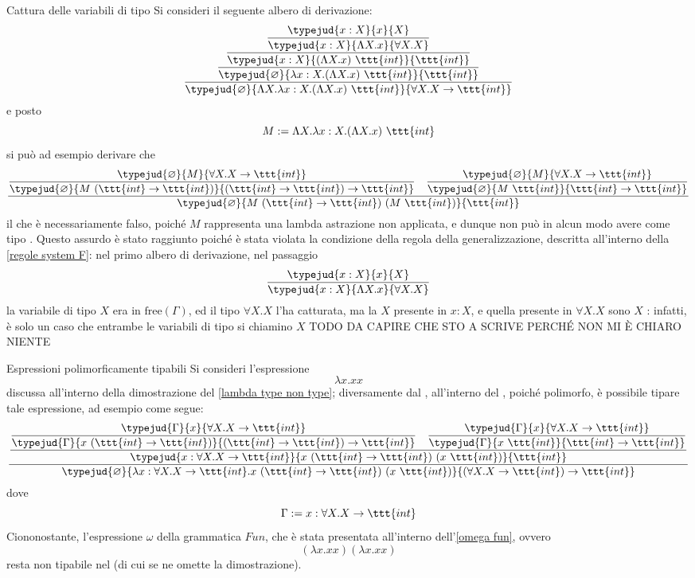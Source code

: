 \documentclass[a4paper, 12pt]{report}
\begin{document}
    \begin{framedobs}{Cattura delle variabili di tipo}
        Si consideri il seguente albero di derivazione: $$\dfrac{\dfrac{\dfrac{\dfrac{\typejud{x:X}{x}{X}}{\typejud{x:X}{\Lambda X.x}{\forall X.X}}}{\typejud{x:X}{(\Lambda X.x) \ \ttt{int}}{\ttt{int}}}}{\typejud{\varnothing}{\lambda x:X.(\Lambda X.x) \ \ttt{int}}{\ttt{int}}}}{\typejud{\varnothing}{\Lambda X.\lambda x:X.(\Lambda X.x) \ \ttt{int}}{\forall X.X \to \ttt{int}}}$$ e posto $$M := \Lambda X.\lambda x:X.(\Lambda X.x) \ \ttt{int}$$ si può ad esempio derivare che $$\dfrac{\dfrac{\typejud{\varnothing}{M}{\forall X.X \to \ttt{int}}}{\typejud{\varnothing}{M \ (\ttt{int} \to \ttt{int})}{(\ttt{int} \to \ttt{int}) \to \ttt{int}}} \quad \dfrac{\typejud{\varnothing}{M}{\forall X.X \to \ttt{int}}}{\typejud{\varnothing}{M \ \ttt{int}}{\ttt{int} \to \ttt{int}}}}{\typejud{\varnothing}{M \ (\ttt{int} \to \ttt{int}) \ (M \ \ttt{int})}{\ttt{int}}}$$ il che è necessariamente falso, poiché $M$ rappresenta una lambda astrazione non applicata, e dunque non può in alcun modo avere come tipo . Questo assurdo è stato raggiunto poiché è stata violata la condizione della regola della generalizzazione, descritta all'interno della \cref{regole system F}: nel primo albero di derivazione, nel passaggio $$\dfrac{\typejud{x:X}{x}{X}}{\typejud{x:X}{\Lambda X.x}{\forall X.X}}$$ la variabile di tipo $X$ era in $\mathrm{free}(\Gamma)$, ed il tipo $\forall X.X$ l'ha catturata, ma la $X$ presente in $x:X$, e quella presente in $\forall X.X$ sono $X$ : infatti, è solo un caso che entrambe le variabili di tipo si chiamino $X$ TODO DA CAPIRE CHE STO A SCRIVE PERCHÉ NON MI È CHIARO NIENTE
    \end{framedobs}

    \begin{framedobs}[label={exp poly typable}]{Espressioni polimorficamente tipabili}
        Si consideri l'espressione $$\lambda x.xx$$ discussa all'interno della dimostrazione del \cref{lambda type non type}; diversamente dal , all'interno del , poiché polimorfo, è possibile tipare tale espressione, ad esempio come segue: $$\dfrac{\dfrac{\dfrac{\typejud{\Gamma}{x}{\forall X.X \to \ttt{int}}}{\typejud{\Gamma}{x \ (\ttt{int} \to \ttt{int})}{(\ttt{int} \to \ttt{int}) \to \ttt{int}}} \quad \dfrac{\typejud{\Gamma}{x}{\forall X. X \to \ttt{int}}}{\typejud{\Gamma}{x \ \ttt{int}}{\ttt{int} \to \ttt{int}}}}{\typejud{x:\forall X.X \to \ttt{int}}{x \ (\ttt{int} \to \ttt{int}) \ (x \ \ttt{int})}{\ttt{int}}}}{\typejud{\varnothing}{\lambda x:\forall X.X \to \ttt{int}.x \ (\ttt{int} \to \ttt{int}) \ (x \ \ttt{int})}{(\forall X .X \to \ttt{int}) \to \ttt{int}}}$$ dove $$\Gamma := x : \forall X.X \to \ttt{int}$$ Ciononostante, l'espressione $\omega$ della grammatica $Fun$, che è stata presentata all'interno dell'\cref{omega fun}, ovvero $$(\lambda x. xx) (\lambda x. xx)$$ resta non tipabile nel  (di cui se ne omette la dimostrazione).
    \end{framedobs}
\end{document}
